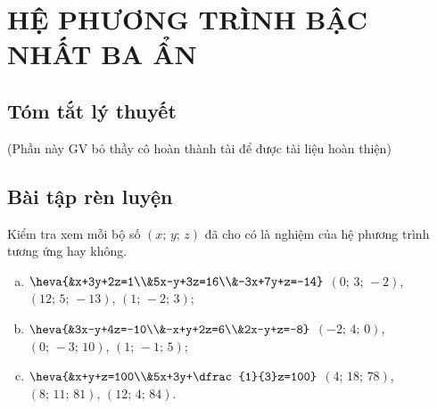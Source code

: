 \section{HỆ PHƯƠNG TRÌNH BẬC NHẤT BA ẨN}
\subsection{Tóm tắt lý thuyết}
(Phần này GV bỏ thầy cô hoàn thành tài để được tài liệu hoàn thiện)
\subsection{Bài tập rèn luyện}
\begin{bt}
	Kiểm tra xem mỗi bộ số $(x;\,y;\,z)$ đã cho có là nghiệm của hệ phương trình tương ứng hay không.
	\begin{enumerate}[a)]
		\item $\heva{&x+3y+2z=1\\&5x-y+3z=16\\&-3x+7y+z=-14}$ \qquad $(0;\,3;\,-2)$, $(12;\,5;\,-13)$, $(1;\,-2;\,3)$;
		\item $\heva{&3x-y+4z=-10\\&-x+y+2z=6\\&2x-y+z=-8}$ \qquad $(-2;\,4;\,0)$, $(0;\,-3;\,10)$, $(1;\,-1;\,5)$;
		\item $\heva{&x+y+z=100\\&5x+3y+\dfrac{1}{3}z=100}$ \qquad $(4;\,18;\,78)$, $(8;\,11;\,81)$, $(12;\,4;\,84)$.
	\end{enumerate}
\end{bt}

